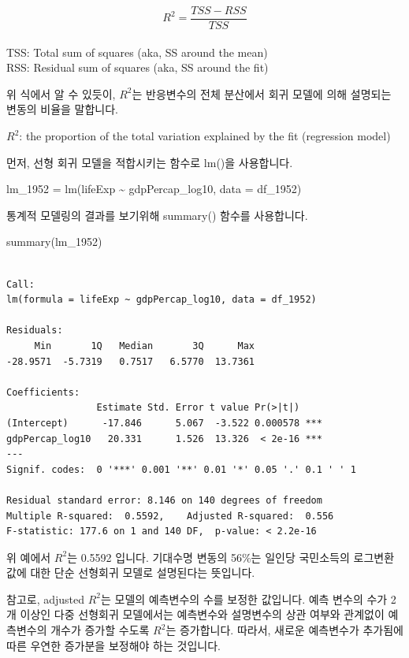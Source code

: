 \documentclass[
  letterpaper,
  DIV=11,
  numbers=noendperiod]{scrartcl}
\newenvironment{Shaded}{\begin{snugshade}}{\end{snugshade}}
\newcommand{\AttributeTok}[1]{\textcolor[rgb]{0.40,0.45,0.13}{#1}}
\newcommand{\FunctionTok}[1]{\textcolor[rgb]{0.28,0.35,0.67}{#1}}
\newcommand{\NormalTok}[1]{\textcolor[rgb]{0.00,0.23,0.31}{#1}}
\newcommand{\OtherTok}[1]{\textcolor[rgb]{0.00,0.23,0.31}{#1}}
\newcommand{\SpecialCharTok}[1]{\textcolor[rgb]{0.37,0.37,0.37}{#1}}
\begin{document}
\[R^2 = \frac{TSS - RSS}{TSS}\]\\
TSS: Total sum of squares (aka, SS around the mean)\\
RSS: Residual sum of squares (aka, SS around the fit)

위 식에서 알 수 있듯이, \(R^2\)는 반응변수의 전체 분산에서 회귀 모델에
의해 설명되는 변동의 비율을 말합니다.

\(R^2\): the proportion of the total variation explained by the fit
(regression model)

먼저, 선형 회귀 모델을 적합시키는 함수로 lm()을 사용합니다.

\begin{Shaded}
\begin{Highlighting}[]
\NormalTok{lm\_1952 }\OtherTok{=} \FunctionTok{lm}\NormalTok{(lifeExp }\SpecialCharTok{\textasciitilde{}}\NormalTok{ gdpPercap\_log10, }\AttributeTok{data =}\NormalTok{ df\_1952)}
\end{Highlighting}
\end{Shaded}

통계적 모델링의 결과를 보기위해 summary() 함수를 사용합니다.

\begin{Shaded}
\begin{Highlighting}[]
\FunctionTok{summary}\NormalTok{(lm\_1952)}
\end{Highlighting}
\end{Shaded}

\begin{verbatim}

Call:
lm(formula = lifeExp ~ gdpPercap_log10, data = df_1952)

Residuals:
     Min       1Q   Median       3Q      Max 
-28.9571  -5.7319   0.7517   6.5770  13.7361 

Coefficients:
                Estimate Std. Error t value Pr(>|t|)    
(Intercept)      -17.846      5.067  -3.522 0.000578 ***
gdpPercap_log10   20.331      1.526  13.326  < 2e-16 ***
---
Signif. codes:  0 '***' 0.001 '**' 0.01 '*' 0.05 '.' 0.1 ' ' 1

Residual standard error: 8.146 on 140 degrees of freedom
Multiple R-squared:  0.5592,    Adjusted R-squared:  0.556 
F-statistic: 177.6 on 1 and 140 DF,  p-value: < 2.2e-16
\end{verbatim}

위 예에서 \(R^2\)는 0.5592 입니다. 기대수명 변동의 56\%는 일인당
국민소득의 로그변환값에 대한 단순 선형회귀 모델로 설명된다는 뜻입니다.

참고로, adjusted \(R^2\)는 모델의 예측변수의 수를 보정한 값입니다. 예측
변수의 수가 2개 이상인 다중 선형회귀 모델에서는 예측변수와 설명변수의
상관 여부와 관계없이 예측변수의 개수가 증가할 수도록 \(R^2\)는
증가합니다. 따라서, 새로운 예측변수가 추가됨에 따른 우연한 증가분을
보정해야 하는 것입니다.
\end{document}
